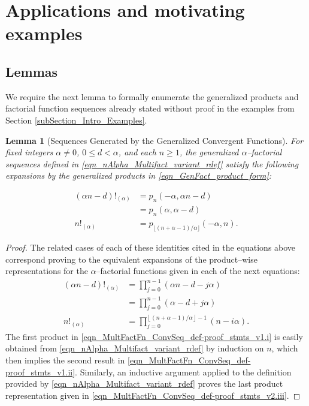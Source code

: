 \documentclass[12pt,reqno]{article}
\renewenvironment{subequations}{%
  \refstepcounter{equation}%
  \edef\theparentequation{\theequation}%
  \setcounter{parentequation}{\value{equation}}%
  \setcounter{equation}{0}%
  \def\theequation{\theparentequation.\alph{equation}}%
  \ignorespaces
}{%
  \setcounter{equation}{\value{parentequation}}%
  \ignorespacesafterend
}
\numberwithin{sfootnote}{section}
\numberwithin{equation}{section}
\theoremstyle{DefaultTheoremStyle}
\newtheorem{lemma}[theorem]{Lemma}
\theoremstyle{definition}
\newcommand{\StartGroupingSubEquations}{\begin{subequations}}
\newcommand{\EndGroupingSubEquations}{\end{subequations}}
\newcommand{\MultiFactorial}[2]{\ensuremath{#1!_{\left(#2\right)}}}
\newcommand{\AlphaFactorial}[2]{\ensuremath{\left(#1\right)!_{\left(#2\right)}}}
\begin{document}
\section{Applications and motivating examples} 
\label{Section_Apps_and_Examples} 

\subsection{Lemmas} 
\label{subSection_Apps_and_Examples_StmtsOfLemmas} 

We require the next lemma 
to formally enumerate the generalized products and factorial function sequences 
already stated without proof in the examples from 
Section \ref{subSection_Intro_Examples}. 

\begin{lemma}[Sequences Generated by the Generalized Convergent Functions] 
\label{lemma_GenConvFn_EnumIdents_pnAlphaRSeq_idents_combined_v1} 
For fixed integers $\alpha \neq 0$, $0 \leq d < \alpha$, and each 
$n \geq 1$, the generalized $\alpha$--factorial sequences 
defined in \eqref{eqn_nAlpha_Multifact_variant_rdef} 
satisfy the following expansions by the generalized products in 
\eqref{eqn_GenFact_product_form}: 
\StartGroupingSubEquations 
\begin{align} 
(\alpha n - d)!_{(\alpha)} 
     & = p_n(-\alpha, \alpha n-d) \\ 
     & = p_n(\alpha, \alpha -d) \\ 
\label{eqn_MultFactFn_ConvSeq_def-stmts_v1.c} 
n!_{(\alpha)} 
     & = p_{\lfloor (n+\alpha-1) / \alpha \rfloor}(-\alpha, n). 
\end{align} 
\EndGroupingSubEquations 
\end{lemma} 
\begin{proof} 
The related cases of each of these identities cited in the 
equations above correspond proving to the 
equivalent expansions of the product--wise representations for the 
$\alpha$--factorial functions given in each of the next equations: 
\begin{align*} 
\label{eqn_MultFactFn_ConvSeq_def-proof_stmts_v1.i} 
\tag{a} 
\AlphaFactorial{\alpha n-d}{\alpha} & = 
     \prod_{j=0}^{n-1} \left(\alpha n - d - j\alpha\right) \\ 
\label{eqn_MultFactFn_ConvSeq_def-proof_stmts_v1.ii} 
\tag{b} 
   & = 
     \prod_{j=0}^{n-1} \left(\alpha - d + j \alpha\right) \\ 
\tag{c} 
\label{eqn_MultFactFn_ConvSeq_def-proof_stmts_v2.iii} 
\MultiFactorial{n}{\alpha} & = 
     \prod\limits_{j=0}^{\left\lfloor (n+\alpha-1) / \alpha 
     \right\rfloor - 1} (n-i\alpha). 
\end{align*} 
The first product in \eqref{eqn_MultFactFn_ConvSeq_def-proof_stmts_v1.i} 
is easily obtained from \eqref{eqn_nAlpha_Multifact_variant_rdef} by 
induction on $n$, which then implies the second result in 
\eqref{eqn_MultFactFn_ConvSeq_def-proof_stmts_v1.ii}. 
Similarly, an inductive argument applied to the definition provided by 
\eqref{eqn_nAlpha_Multifact_variant_rdef} 
proves the last product representation given in 
\eqref{eqn_MultFactFn_ConvSeq_def-proof_stmts_v2.iii}. 
\end{proof} 
\end{document}
